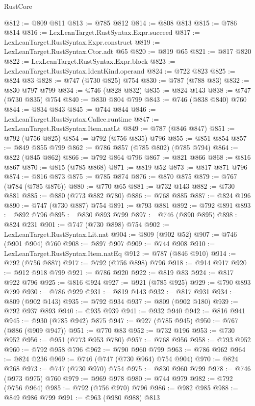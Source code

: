 \begin{lexlean}{RustCore}
\begin{coremodule}
@812 := @809 @811
@813 := @785 @812
@814 := @808 @813
@815 := @786 @814
@816 := LexLeanTarget.RustSyntax.Expr.succeed
@817 := LexLeanTarget.RustSyntax.Expr.construct
@819 := LexLeanTarget.RustSyntax.Ctor.adt @65
@820 := @819 @65
@821 := @817 @820
@822 := LexLeanTarget.RustSyntax.Expr.block
@823 := LexLeanTarget.RustSyntax.IdentKind.operand
@824 := @722 @823
@825 := @824 @83
@828 := @747 (@730 @825) @754
@830 := @787 (@788 @83)
@832 := @830 @797 @799
@834 := @746 (@828 @832)
@835 := @824 @143
@838 := @747 (@730 @835) @754
@840 := @830 @804 @799
@843 := @746 (@838 @840) @760
@844 := @834 @843
@845 := @744 @844
@846 := LexLeanTarget.RustSyntax.Callee.runtime
@847 := LexLeanTarget.RustSyntax.Item.natLt
@849 := @787 (@846 @847)
@851 := @792 (@756 @825)
@854 := @792 (@756 @835) @796
@855 := @851 @854
@857 := @849 @855 @799
@862 := @786 @857 (@785 @802) (@785 @794)
@864 := @822 (@845 @862)
@866 := @792 @864 @796
@867 := @821 @866
@868 := @816 @867
@870 := @815 (@785 @868)
@871 := @819 @52
@873 := @817 @871 @796
@874 := @816 @873
@875 := @785 @874
@876 := @870 @875
@879 := @767 (@784 (@785 @876))
@880 := @770 @65
@881 := @732 @143
@882 := @730 @881
@885 := @880 (@773 @882 @780)
@886 := @768 @885
@887 := @824 @196
@890 := @747 (@730 @887) @754
@891 := @793 @881
@892 := @792 @891
@893 := @892 @796
@895 := @830 @893 @799
@897 := @746 (@890 @895)
@898 := @824 @231
@901 := @747 (@730 @898) @754
@902 := LexLeanTarget.RustSyntax.Lit.nat
@904 := @809 (@902 @52)
@907 := @746 (@901 @904) @760
@908 := @897 @907
@909 := @744 @908
@910 := LexLeanTarget.RustSyntax.Item.natEq
@912 := @787 (@846 @910)
@914 := @792 (@756 @887)
@917 := @792 (@756 @898) @796
@918 := @914 @917
@920 := @912 @918 @799
@921 := @786 @920
@922 := @819 @83
@924 := @817 @922 @796
@925 := @816 @924
@927 := @921 (@785 @925)
@929 := @790 @893 @799
@930 := @786 @929
@931 := @819 @143
@932 := @817 @931
@934 := @809 (@902 @143)
@935 := @792 @934
@937 := @809 (@902 @180)
@939 := @792 @937 @893
@940 := @935 @939
@941 := @932 @940
@942 := @816 @941
@945 := @930 (@785 @942) @875
@947 := @927 (@785 @945)
@950 := @767 (@886 (@909 @947))
@951 := @770 @83
@952 := @732 @196
@953 := @730 @952
@956 := @951 (@773 @953 @780)
@957 := @768 @956
@958 := @793 @952
@960 := @792 @958 @796
@962 := @790 @960 @799
@963 := @786 @962
@964 := @824 @236
@969 := @746 (@747 (@730 @964) @754 @904)
@970 := @824 @268
@973 := @747 (@730 @970) @754
@975 := @830 @960 @799
@978 := @746 (@973 @975) @760
@979 := @969 @978
@980 := @744 @979
@982 := @792 (@756 @964)
@985 := @792 (@756 @970) @796
@986 := @982 @985
@988 := @849 @986 @799
@991 := @963 (@980 @988) @813

\end{coremodule}
\end{lexlean}
